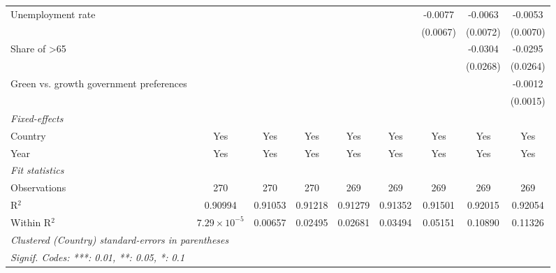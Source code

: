 \begin{table}[htbp]
\begin{tabular}{lcccccccc}
      Unemployment rate                                        &                       &          &          &          &          & -0.0077  & -0.0063  & -0.0053\\   
                                                               &                       &          &          &          &          & (0.0067) & (0.0072) & (0.0070)\\   
      Share of >65                                             &                       &          &          &          &          &          & -0.0304  & -0.0295\\   
                                                               &                       &          &          &          &          &          & (0.0268) & (0.0264)\\   
      Green vs. growth government preferences                  &                       &          &          &          &          &          &          & -0.0012\\   
                                                               &                       &          &          &          &          &          &          & (0.0015)\\   
      \midrule
      \emph{Fixed-effects}\\
      Country                                                  & Yes                   & Yes      & Yes      & Yes      & Yes      & Yes      & Yes      & Yes\\  
      Year                                                     & Yes                   & Yes      & Yes      & Yes      & Yes      & Yes      & Yes      & Yes\\  
      \midrule
      \emph{Fit statistics}\\
      Observations                                             & 270                   & 270      & 270      & 269      & 269      & 269      & 269      & 269\\  
      R$^2$                                                    & 0.90994               & 0.91053  & 0.91218  & 0.91279  & 0.91352  & 0.91501  & 0.92015  & 0.92054\\  
      Within R$^2$                                             & $7.29\times 10^{-5}$  & 0.00657  & 0.02495  & 0.02681  & 0.03494  & 0.05151  & 0.10890  & 0.11326\\  
      \midrule \midrule
      \multicolumn{9}{l}{\emph{Clustered (Country) standard-errors in parentheses}}\\
      \multicolumn{9}{l}{\emph{Signif. Codes: ***: 0.01, **: 0.05, *: 0.1}}\\
   \end{tabular}
\end{table}


